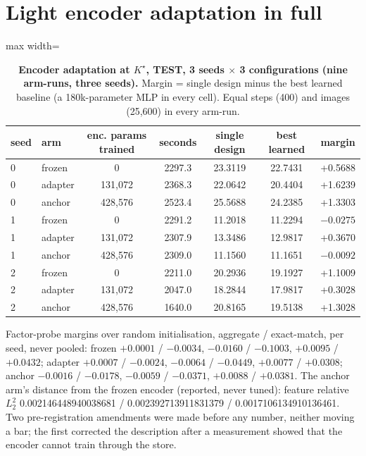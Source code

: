 \documentclass{article}
\newcommand{\Kstar}{\ensuremath{K^{\star}}}
\begin{document}
\section{Light encoder adaptation in full}
\label{app:adapt}

\begin{table}[h]
\centering\small
\caption{\textbf{Encoder adaptation at $\Kstar$, TEST, 3 seeds $\times$ 3 configurations (nine
arm-runs, three seeds).} Margin = single design minus the best learned baseline (a 180k-parameter
MLP in every cell). Equal steps (400) and images (25,600) in every arm-run.}
\label{tab:adapt}
\setlength{\tabcolsep}{3pt}
\begin{adjustbox}{max width=\linewidth}\begin{tabular}{llccccc}
\toprule
seed & arm & enc. params trained & seconds & single design & best learned & margin \\
\midrule
0 & frozen & 0 & 2297.3 & 23.3119 & 22.7431 & +0.5688 \\
0 & adapter & 131,072 & 2368.3 & 22.0642 & 20.4404 & +1.6239 \\
0 & anchor & 428,576 & 2523.4 & 25.5688 & 24.2385 & +1.3303 \\
1 & frozen & 0 & 2291.2 & 11.2018 & 11.2294 & $-0.0275$ \\
1 & adapter & 131,072 & 2307.9 & 13.3486 & 12.9817 & +0.3670 \\
1 & anchor & 428,576 & 2309.0 & 11.1560 & 11.1651 & $-0.0092$ \\
2 & frozen & 0 & 2211.0 & 20.2936 & 19.1927 & +1.1009 \\
2 & adapter & 131,072 & 2047.0 & 18.2844 & 17.9817 & +0.3028 \\
2 & anchor & 428,576 & 1640.0 & 20.8165 & 19.5138 & +1.3028 \\
\bottomrule
\end{tabular}\end{adjustbox}
\end{table}

\noindent Factor-probe margins over random initialisation, aggregate / exact-match, per seed, never
pooled: frozen $+0.0001$ / $-0.0034$, $-0.0160$ / $-0.1003$, $+0.0095$ / $+0.0432$; adapter
$+0.0007$ / $-0.0024$, $-0.0064$ / $-0.0449$, $+0.0077$ / $+0.0308$; anchor $-0.0016$ / $-0.0178$,
$-0.0059$ / $-0.0371$, $+0.0088$ / $+0.0381$. The anchor arm's distance from the frozen encoder
(reported, never tuned): feature relative $L_2^2$ 0.002146448940038681 / 0.002392713911831379 /
0.0017106134910136461.
Two pre-registration amendments were made before any number, neither moving a bar; the first
corrected the description after a measurement showed that the encoder cannot train through the
store.
\end{document}
